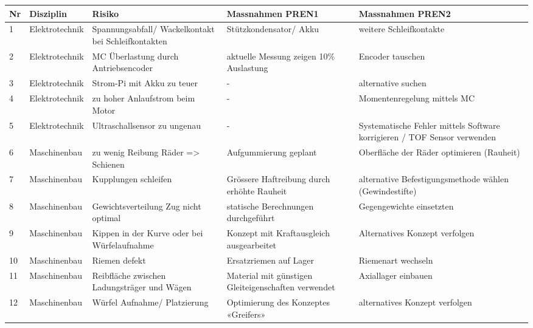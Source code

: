 \documentclass[../../main.tex]{subfiles}
\begin{document}
    \begin{longtable}{|l|p{2.5cm}|p{3cm}|p{3.8cm}|p{3.8cm}|}
    \hline
    \textbf{Nr} & \textbf{Disziplin} & \textbf{Risiko} & \textbf{Massnahmen PREN1} & \textbf{Massnahmen PREN2} \\ \hline
    1    &  Elektrotechnik    & Spannungsabfall/ Wackelkontakt bei Schleifkontakten & Stützkondensator/ Akku & weitere Schleifkontakte \\ \hline
    2    &  Elektrotechnik    & MC Überlastung durch Antriebsencoder                & aktuelle Messung zeigen 10\% Auslastung & Encoder tauschen \\ \hline
    3    & Elektrotechnik    & Strom-Pi mit Akku zu teuer                           & -  & alternative suchen \\ \hline
    4    & Elektrotechnik    & zu hoher Anlaufstrom beim Motor                      & -  & Momentenregelung mittels MC \\ \hline
    5    & Elektrotechnik    & Ultraschallsensor zu ungenau                         & - & Systematische Fehler mittels Software korrigieren / TOF Sensor verwenden \\ \hline
    6    & Maschinenbau      & zu wenig Reibung Räder => Schienen                   & Aufgummierung geplant & Oberfläche der Räder optimieren (Rauheit) \\ \hline
    7    & Maschinenbau     & Kupplungen schleifen                                  & Grössere Haftreibung durch erhöhte Rauheit & alternative Befestigungsmethode wählen (Gewindestifte) \\ \hline
    8    & Maschinenbau & Gewichtsverteilung Zug nicht optimal                      & statische Berechnungen durchgeführt & Gegengewichte einsetzten \\ \hline
    9   & Maschinenbau  & Kippen in der Kurve oder bei Würfelaufnahme               & Konzept mit Kraftausgleich ausgearbeitet & Alternatives Konzept verfolgen \\ \hline
    10  & Maschinenbau & Riemen defekt                                              & Ersatzriemen auf Lager            & Riemenart wechseln \\ \hline
    11  & Maschinenbau & Reibfläche zwischen Ladungsträger und Wägen                & Material mit günstigen Gleiteigenschaften verwendet & Axiallager einbauen \\ \hline
    12  & Maschinenbau & Würfel Aufnahme/ Platzierung                               & Optimierung des Konzeptes «Greifers» & alternatives Konzept verfolgen \\ \hline

\end{longtable}
\end{document}
